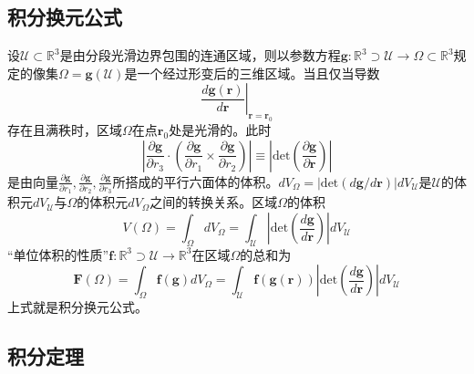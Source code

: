 \documentclass[main.tex]{subfiles}
\begin{document}
\subsection{积分换元公式\cite[p.~116,“五”]{华工高数2009下}}
设$\mathcal{U}\subset\mathbb{R}^3$是由分段光滑边界包围的连通区域，则以参数方程$\mathbf{g}:\mathbb{R}^3\supset \mathcal{U}\rightarrow\Omega\subset\mathbb{R}^3$规定的像集$\Omega=\mathbf{g}\left(\mathcal{U}\right)$是一个经过形变后的三维区域。当且仅当导数
\[
\left.\frac{d\mathbf{g}\left(\mathbf{r}\right)}{d\mathbf{r}}\right|_{\mathbf{r}=\mathbf{r}_0}
\]
存在且满秩时，区域$\Omega$在点$\mathbf{r}_0$处是光滑的。此时
\[
\left|\frac{\partial \mathbf{g}}{\partial r_3}\cdot\left(\frac{\partial\mathbf{g}}{\partial r_1}\times\frac{\partial\mathbf{g}}{\partial r_2}\right)\right|\equiv\left|\mathrm{det}\left(\frac{\partial\mathbf{g}}{\partial\mathbf{r}}\right)\right|
\]
是由向量$\frac{\partial\mathbf{g}}{\partial r_1},\frac{\partial\mathbf{g}}{\partial r_2},\frac{\partial\mathbf{g}}{\partial r_3}$所搭成的平行六面体的体积。$dV_\Omega=\left|\mathrm{det}\left(d\mathbf{g}/d\mathbf{r}\right)\right|dV_\mathcal{U}$是$\mathcal{U}$的体积元$dV_\mathcal{U}$与$\Omega$的体积元$dV_\Omega$之间的转换关系。区域$\Omega$的体积
\[
V\left(\Omega\right)=\int_\Omega dV_\Omega=\int_\mathcal{U}\left|\mathrm{det}\left(\frac{d\mathbf{g}}{d\mathbf{r}}\right)\right|dV_\mathcal{U}
\]
“单位体积的性质”$\mathbf{f}:\mathbb{R}^3\supset\mathcal{U}\rightarrow\mathbb{R}^3$在区域$\Omega$的总和为
\[
\mathbf{F}\left(\Omega\right)=\int_\Omega\mathbf{f}\left(\mathbf{g}\right)dV_\Omega=\int_\mathcal{U}\mathbf{f}\left(\mathbf{g}\left(\mathbf{r}\right)\right)\left|\mathrm{det}\left(\frac{d\mathbf{g}}{d\mathbf{r}}\right)\right|dV_\mathcal{U}
\]
上式就是积分换元公式。

\subsection{积分定理}
\end{document}
